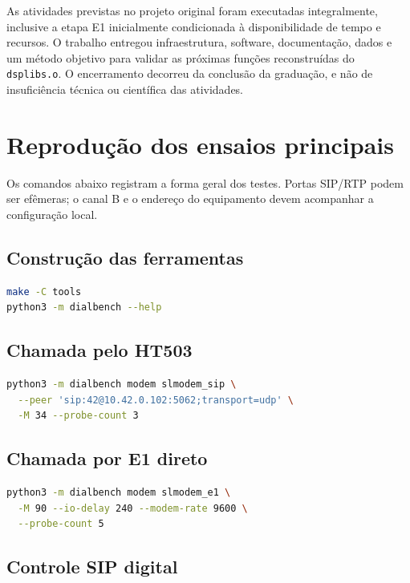 \documentclass[12pt,a4paper]{article}
\newcommand{\dsplibs}{\texttt{dsplibs.o}}
\begin{document}
As atividades previstas no projeto original foram executadas integralmente, inclusive
a etapa E1 inicialmente condicionada à disponibilidade de tempo e recursos. O
trabalho entregou infraestrutura, software, documentação, dados e um método objetivo
para validar as próximas funções reconstruídas do \dsplibs. O encerramento decorreu
da conclusão da graduação, e não de insuficiência técnica ou científica das
atividades.

\clearpage
\appendix

\section{Reprodução dos ensaios principais}

Os comandos abaixo registram a forma geral dos testes. Portas SIP/RTP podem ser
efêmeras; o canal B e o endereço do equipamento devem acompanhar a configuração
local.

\subsection{Construção das ferramentas}

\begin{lstlisting}[language=bash]
make -C tools
python3 -m dialbench --help
\end{lstlisting}

\subsection{Chamada pelo HT503}

\begin{lstlisting}[language=bash]
python3 -m dialbench modem slmodem_sip \
  --peer 'sip:42@10.42.0.102:5062;transport=udp' \
  -M 34 --probe-count 3
\end{lstlisting}

\subsection{Chamada por E1 direto}

\begin{lstlisting}[language=bash]
python3 -m dialbench modem slmodem_e1 \
  -M 90 --io-delay 240 --modem-rate 9600 \
  --probe-count 5
\end{lstlisting}

\subsection{Controle SIP digital}
\end{document}
